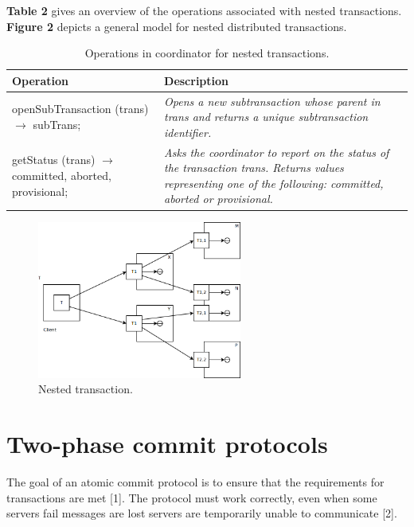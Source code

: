 \textbf{Table 2} gives an overview of the operations associated with nested transactions. \textbf{Figure 2} depicts a general model for nested distributed transactions.

\begin{table}
	\caption{Operations in coordinator for nested transactions.}
	\label{tab:api:nestedtransactions}
	\begin{tabular}{p{150px} | p{250px}}
		\textbf{Operation} & \textbf{Description} \\
		\hline
		openSubTransaction (trans) $\rightarrow$ subTrans; 								& \emph{Opens a new subtransaction whose parent in trans and returns a unique subtransaction identifier.} \\
		getStatus (trans) $\rightarrow$ committed, aborted, provisional; 	& \emph{Asks the coordinator to report on the status of the transaction trans. Returns values representing one of the following: committed, aborted or provisional.} \\
		\hline
	\end{tabular}
\end{table}



\begin{figure}
	\begin{center}
		\includegraphics[width=0.6\textwidth]{img/nestedtransaction}
	\end{center}
	\caption{Nested transaction.}
	\label{fig:nestedtransaction}
\end{figure}



\section{Two-phase commit protocols}

The goal of an atomic commit protocol is to ensure that the requirements for transactions are met [1]. The protocol must work correctly, even when some servers fail messages are lost servers are temporarily unable to communicate [2].

